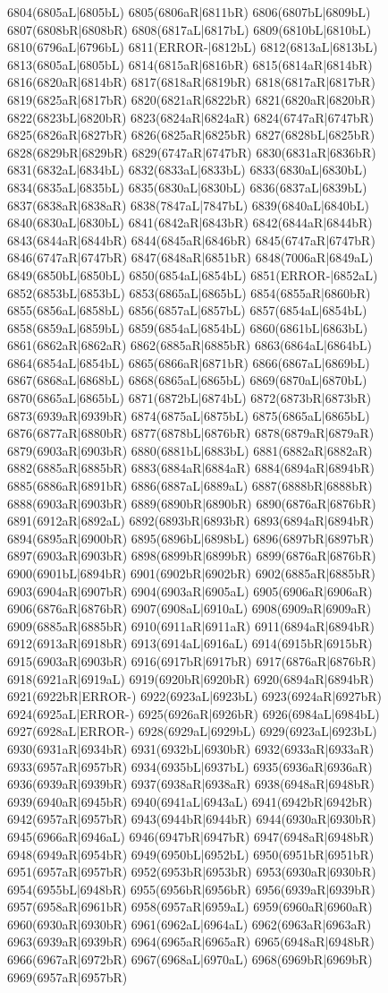 6804(6805aL|6805bL) 6805(6806aR|6811bR) 6806(6807bL|6809bL) 6807(6808bR|6808bR) 6808(6817aL|6817bL) 6809(6810bL|6810bL) 6810(6796aL|6796bL) 6811(ERROR-|6812bL) 6812(6813aL|6813bL) 6813(6805aL|6805bL) 6814(6815aR|6816bR) 6815(6814aR|6814bR) 6816(6820aR|6814bR) 6817(6818aR|6819bR) 6818(6817aR|6817bR) 6819(6825aR|6817bR) 6820(6821aR|6822bR) 6821(6820aR|6820bR) 6822(6823bL|6820bR) 6823(6824aR|6824aR) 6824(6747aR|6747bR) 6825(6826aR|6827bR) 6826(6825aR|6825bR) 6827(6828bL|6825bR) 6828(6829bR|6829bR) 6829(6747aR|6747bR) 6830(6831aR|6836bR) 6831(6832aL|6834bL) 6832(6833aL|6833bL) 6833(6830aL|6830bL) 6834(6835aL|6835bL) 6835(6830aL|6830bL) 6836(6837aL|6839bL) 6837(6838aR|6838aR) 6838(7847aL|7847bL) 6839(6840aL|6840bL) 6840(6830aL|6830bL) 6841(6842aR|6843bR) 6842(6844aR|6844bR) 6843(6844aR|6844bR) 6844(6845aR|6846bR) 6845(6747aR|6747bR) 6846(6747aR|6747bR) 6847(6848aR|6851bR) 6848(7006aR|6849aL) 6849(6850bL|6850bL) 6850(6854aL|6854bL) 6851(ERROR-|6852aL) 6852(6853bL|6853bL) 6853(6865aL|6865bL) 6854(6855aR|6860bR) 6855(6856aL|6858bL) 6856(6857aL|6857bL) 6857(6854aL|6854bL) 6858(6859aL|6859bL) 6859(6854aL|6854bL) 6860(6861bL|6863bL) 6861(6862aR|6862aR) 6862(6885aR|6885bR) 6863(6864aL|6864bL) 6864(6854aL|6854bL) 6865(6866aR|6871bR) 6866(6867aL|6869bL) 6867(6868aL|6868bL) 6868(6865aL|6865bL) 6869(6870aL|6870bL) 6870(6865aL|6865bL) 6871(6872bL|6874bL) 6872(6873bR|6873bR) 6873(6939aR|6939bR) 6874(6875aL|6875bL) 6875(6865aL|6865bL) 6876(6877aR|6880bR) 6877(6878bL|6876bR) 6878(6879aR|6879aR) 6879(6903aR|6903bR) 6880(6881bL|6883bL) 6881(6882aR|6882aR) 6882(6885aR|6885bR) 6883(6884aR|6884aR) 6884(6894aR|6894bR) 6885(6886aR|6891bR) 6886(6887aL|6889aL) 6887(6888bR|6888bR) 6888(6903aR|6903bR) 6889(6890bR|6890bR) 6890(6876aR|6876bR) 6891(6912aR|6892aL) 6892(6893bR|6893bR) 6893(6894aR|6894bR) 6894(6895aR|6900bR) 6895(6896bL|6898bL) 6896(6897bR|6897bR) 6897(6903aR|6903bR) 6898(6899bR|6899bR) 6899(6876aR|6876bR) 6900(6901bL|6894bR) 6901(6902bR|6902bR) 6902(6885aR|6885bR) 6903(6904aR|6907bR) 6904(6903aR|6905aL) 6905(6906aR|6906aR) 6906(6876aR|6876bR) 6907(6908aL|6910aL) 6908(6909aR|6909aR) 6909(6885aR|6885bR) 6910(6911aR|6911aR) 6911(6894aR|6894bR) 6912(6913aR|6918bR) 6913(6914aL|6916aL) 6914(6915bR|6915bR) 6915(6903aR|6903bR) 6916(6917bR|6917bR) 6917(6876aR|6876bR) 6918(6921aR|6919aL) 6919(6920bR|6920bR) 6920(6894aR|6894bR) 6921(6922bR|ERROR-) 6922(6923aL|6923bL) 6923(6924aR|6927bR) 6924(6925aL|ERROR-) 6925(6926aR|6926bR) 6926(6984aL|6984bL) 6927(6928aL|ERROR-) 6928(6929aL|6929bL) 6929(6923aL|6923bL) 6930(6931aR|6934bR) 6931(6932bL|6930bR) 6932(6933aR|6933aR) 6933(6957aR|6957bR) 6934(6935bL|6937bL) 6935(6936aR|6936aR) 6936(6939aR|6939bR) 6937(6938aR|6938aR) 6938(6948aR|6948bR) 6939(6940aR|6945bR) 6940(6941aL|6943aL) 6941(6942bR|6942bR) 6942(6957aR|6957bR) 6943(6944bR|6944bR) 6944(6930aR|6930bR) 6945(6966aR|6946aL) 6946(6947bR|6947bR) 6947(6948aR|6948bR) 6948(6949aR|6954bR) 6949(6950bL|6952bL) 6950(6951bR|6951bR) 6951(6957aR|6957bR) 6952(6953bR|6953bR) 6953(6930aR|6930bR) 6954(6955bL|6948bR) 6955(6956bR|6956bR) 6956(6939aR|6939bR) 6957(6958aR|6961bR) 6958(6957aR|6959aL) 6959(6960aR|6960aR) 6960(6930aR|6930bR) 6961(6962aL|6964aL) 6962(6963aR|6963aR) 6963(6939aR|6939bR) 6964(6965aR|6965aR) 6965(6948aR|6948bR) 6966(6967aR|6972bR) 6967(6968aL|6970aL) 6968(6969bR|6969bR) 6969(6957aR|6957bR) 